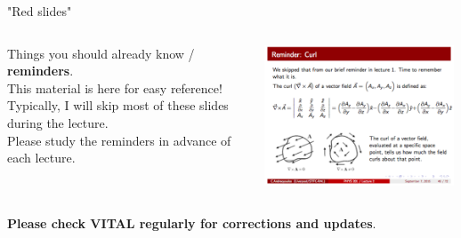 \begin{frame}{"Red slides"}

\begin{columns}
  \begin{column}{0.30\textwidth}
   \begin{center}
      Things you should already know / {\bf reminders}.\\
      \vspace{0.2cm}
      This material is here for easy reference!
      Typically, I will skip most of these slides during the lecture.\\
      \vspace{0.2cm}
      Please study the reminders in advance of each lecture.\\
   \end{center}
  \end{column}
  \begin{column}{0.70\textwidth}
   \begin{center}
     \includegraphics[width=0.99\textwidth]{./images/example_slides/reminder.png}\\
   \end{center}
  \end{column}
\end{columns}

\vspace{0.2cm}

\begin{center}
 {\bf Please check VITAL regularly for corrections and updates}.\\
\end{center}

\end{frame}


